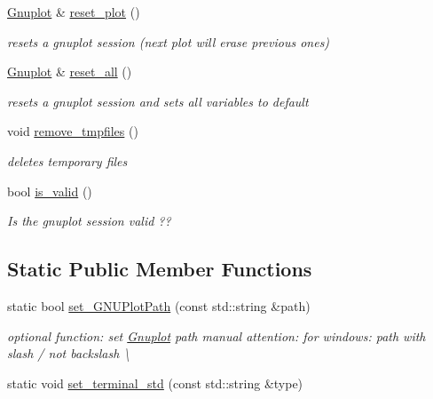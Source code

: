 \begin{DoxyCompactItemize}
\mbox{\label{class_gnuplot_a6797761712d3c311e3685bcccba65dd4}} 
\hyperlink{class_gnuplot}{Gnuplot} \& \hyperlink{class_gnuplot_a6797761712d3c311e3685bcccba65dd4}{reset\+\_\+plot} ()
\begin{DoxyCompactList}\small\item\em resets a gnuplot session (next plot will erase previous ones) \end{DoxyCompactList}\item 
\mbox{\label{class_gnuplot_a9aedfe8371083a1a3ac2b9493810049c}} 
\hyperlink{class_gnuplot}{Gnuplot} \& \hyperlink{class_gnuplot_a9aedfe8371083a1a3ac2b9493810049c}{reset\+\_\+all} ()
\begin{DoxyCompactList}\small\item\em resets a gnuplot session and sets all variables to default \end{DoxyCompactList}\item 
\mbox{\label{class_gnuplot_a2e449552587b0055f40f4ee079d62a8d}} 
void \hyperlink{class_gnuplot_a2e449552587b0055f40f4ee079d62a8d}{remove\+\_\+tmpfiles} ()
\begin{DoxyCompactList}\small\item\em deletes temporary files \end{DoxyCompactList}\item 
bool \hyperlink{class_gnuplot_a3135ffebb308b50c4f3178a62b23ab03}{is\+\_\+valid} ()
\begin{DoxyCompactList}\small\item\em Is the gnuplot session valid ?? \end{DoxyCompactList}\end{DoxyCompactItemize}
\subsection*{Static Public Member Functions}
\begin{DoxyCompactItemize}
\item 
static bool \hyperlink{class_gnuplot_a67cae885c26ced821e335d98986f1967}{set\+\_\+\+G\+N\+U\+Plot\+Path} (const std\+::string \&path)
\begin{DoxyCompactList}\small\item\em optional function\+: set \hyperlink{class_gnuplot}{Gnuplot} path manual attention\+: for windows\+: path with slash \textquotesingle{}/\textquotesingle{} not backslash \textquotesingle{}\textbackslash{}\textquotesingle{} \end{DoxyCompactList}\item 
static void \hyperlink{class_gnuplot_a21feba7a3916708b742c3dc25850ab2f}{set\+\_\+terminal\+\_\+std} (const std\+::string \&type)
\end{DoxyCompactItemize}



